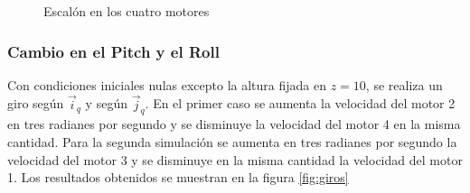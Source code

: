 \documentclass[main]{subfiles}
\begin{document}
\begin{figure} [h!]
  \centering
  \caption{Escal\'on en los cuatro motores}
  \label{fig:escalon}
\end{figure}

\subsubsection*{Cambio en el Pitch y el Roll}
Con condiciones iniciales nulas excepto la altura fijada en $z=10$, se realiza un giro seg\'un $\vec{i}_q$ y seg\'un $\vec{j}_q$. En el primer caso se aumenta la velocidad del motor 2 en tres radianes por segundo y se disminuye la velocidad del motor 4 en la misma cantidad. Para la segunda simulaci\'on se aumenta en tres radianes por segundo la velocidad del motor 3 y se disminuye en la misma cantidad la velocidad del motor 1. Los resultados obtenidos se muestran en la figura \ref{fig:giros}
\end{document}
